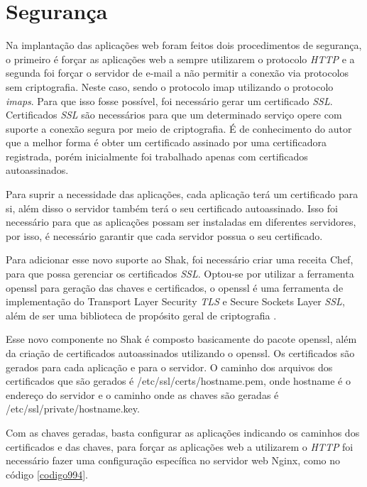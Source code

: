 \section{Segurança}
\label{sub:seguranca}

Na implantação das aplicações web foram feitos dois procedimentos de segurança, o primeiro
é forçar as aplicações web a sempre utilizarem o protocolo \textit{HTTP} e a segunda foi forçar o
servidor de e-mail a não permitir a conexão via protocolos sem criptografia. Neste
caso, sendo o protocolo imap utilizando o protocolo \textit{imaps}. Para que 
isso fosse possível, foi necessário gerar um certificado \textit{SSL}. Certificados 
\textit{SSL} são necessários para que um determinado serviço opere com suporte 
a conexão segura por meio de criptografia.
É de conhecimento do autor que a melhor forma é obter um certificado assinado
por uma certificadora registrada, porém inicialmente foi trabalhado apenas com certificados
autoassinados.

Para suprir a necessidade das aplicações, cada aplicação terá um certificado para
si, além disso o servidor também terá o seu certificado autoassinado. Isso foi necessário
para que as aplicações possam ser instaladas em diferentes servidores, por
isso, é necessário garantir que cada servidor possua o seu certificado. 

Para adicionar esse novo suporte ao Shak, foi necessário criar uma receita Chef,
para que possa gerenciar os certificados \textit{SSL}. Optou-se por utilizar a ferramenta
openssl para geração das chaves e certificados, o openssl é uma ferramenta de
implementação do Transport Layer Security \textit{TLS} e Secure Sockets Layer \textit{SSL},
além de ser uma biblioteca de propósito geral de criptografia \cite{openssl}.

Esse novo componente no Shak é composto basicamente do pacote openssl, além da criação
de certificados autoassinados utilizando o openssl. Os certificados são gerados 
para cada aplicação e para o servidor. O caminho dos arquivos dos certificados que 
são gerados é /etc/ssl/certs/hostname.pem, onde hostname é o endereço do servidor
e o caminho onde as chaves são geradas é /etc/ssl/private/hostname.key.

Com as chaves geradas, basta configurar as aplicações indicando os caminhos dos certificados
e das chaves, para forçar as aplicações web a utilizarem o \textit{HTTP} foi necessário fazer
uma configuração específica no servidor web Nginx, como no código \ref{codigo994}.

